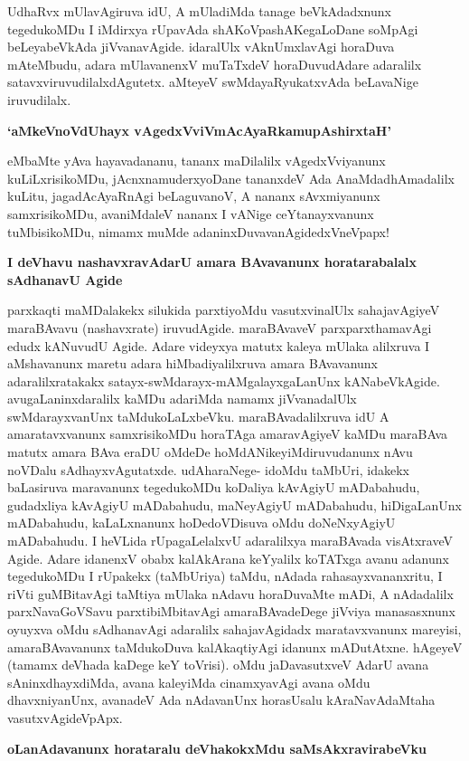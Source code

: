 UdhaRvx mUlavAgiruva idU, A mUladiMda tanage beVkAdadxnunx tegedukoMDu I iMdirxya rUpavAda shAKoVpashAKegaLoDane soMpAgi beLeyabeVkAda jiVvanavAgide. idaralUlx vAknUmxlavAgi horaDuva mAteMbudu, adara mUlavanenxV muTaTxdeV horaDuvudAdare adaralilx satavxviruvudilalxdAgutetx. aMteyeV swMdayaRyukatxvAda beLavaNige iruvudilalx.

\noindent
{\bf\large{`aMkeVnoVdUhayx vAgedxVviVmAcAyaRkamupAshirxtaH'}}

eMbaMte yAva hayavadananu, tananx maDilalilx vAgedxVviyanunx kuLiLxrisikoMDu, jAcnxnamuderxyoDane tananxdeV Ada AnaMdadhAmadalilx kuLitu, jagadAcAyaRnAgi beLaguvanoV, A nananx sAvxmiyanunx samxrisikoMDu, avaniMdaleV nananx I vANige ceYtanayxvanunx tuMbisikoMDu, nimamx muMde adaninxDuvavanAgidedxVneVpapx!

\noindent
{\bf\large{I deVhavu nashavxravAdarU amara BAvavanunx horatarabalalx sAdhanavU Agide}}\label{page129}

parxkaqti maMDalakekx silukida parxtiyoMdu vasutxvinalUlx sahajavAgiyeV maraBAvavu (nashavxrate) iruvudAgide. maraBAvaveV parxparxthamavAgi edudx kANuvudU Agide. Adare videyxya matutx kaleya mUlaka alilxruva I aMshavanunx maretu adara hiMbadiyalilxruva amara BAvavanunx adaralilxratakakx satayx-swMdarayx-mAMgalayxgaLanUnx kANabeVkAgide. avugaLaninxdaralilx kaMDu adariMda namamx jiVvanadalUlx swMdarayxvanUnx taMdukoLaLxbeVku. maraBAvadalilxruva idU A amaratavxvanunx samxrisikoMDu horaTAga amaravAgiyeV kaMDu maraBAva matutx amara BAva eraDU oMdeDe hoMdANikeyiMdiruvudanunx nAvu noVDalu sAdhayxvAgutatxde. udAharaNege- idoMdu taMbUri, idakekx baLasiruva maravanunx tegedukoMDu koDaliya kAvAgiyU mADabahudu, gudadxliya kAvAgiyU mADabahudu, maNeyAgiyU mADabahudu, hiDigaLanUnx mADabahudu, kaLaLxnanunx hoDedoVDisuva oMdu doNeNxyAgiyU mADabahudu. I heVLida rUpagaLelalxvU adaralilxya maraBAvada visAtxraveV Agide. Adare idanenxV obabx kalAkArana keYyalilx koTATxga avanu adanunx tegedukoMDu I rUpakekx (taMbUriya) taMdu, nAdada rahasayxvananxritu, I riVti guMBitavAgi taMtiya mUlaka nAdavu horaDuvaMte mADi, A nAdadalilx parxNavaGoVSavu parxtibiMbitavAgi amaraBAvadeDege jiVviya manasasxnunx oyuyxva oMdu sAdhanavAgi adaralilx sahajavAgidadx maratavxvanunx mareyisi, amaraBAvavanunx taMdukoDuva kalAkaqtiyAgi idanunx mADutAtxne. hAgeyeV (tamamx deVhada kaDege keY toVrisi). oMdu jaDavasutxveV AdarU avana sAninxdhayxdiMda, avana kaleyiMda cinamxyavAgi avana oMdu dhavxniyanUnx, avanadeV Ada nAdavanUnx horasUsalu kAraNavAdaMtaha vasutxvAgideVpApx.

\noindent
{\bf\large{oLanAdavanunx horataralu deVhakokxMdu saMsAkxravirabeVku}}\label{page130}

